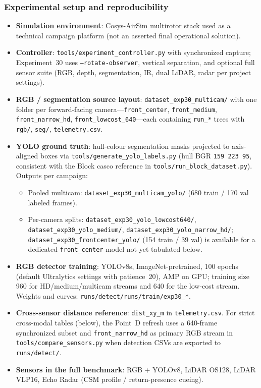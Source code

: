 \subsubsection{Experimental setup and reproducibility}
\begin{itemize}
  \item \textbf{Simulation environment}: Cosys-AirSim multirotor stack used as a technical campaign platform (not an asserted final operational solution).
  \item \textbf{Controller}: \texttt{tools/experiment\_controller.py} with synchronized capture; Experiment~30 uses \texttt{--rotate-observer}, vertical separation, and optional full sensor suite (RGB, depth, segmentation, IR, dual LiDAR, radar per project settings).
  \item \textbf{RGB / segmentation source layout}: \texttt{dataset\_exp30\_multicam/} with one folder per forward-facing camera---\texttt{front\_center}, \texttt{front\_medium}, \texttt{front\_narrow\_hd}, \texttt{front\_lowcost\_640}---each containing \texttt{run\_*} trees with \texttt{rgb/}, \texttt{seg/}, \texttt{telemetry.csv}.
  \item \textbf{YOLO ground truth}: hull-colour segmentation masks projected to axis-aligned boxes via \texttt{tools/generate\_yolo\_labels.py} (hull BGR \texttt{159\,223\,95}, consistent with the Block casco reference in \texttt{tools/run\_block\_dataset.py}). Outputs per campaign:
  \begin{itemize}
    \item Pooled multicam: \texttt{dataset\_exp30\_multicam\_yolo/} (680 train / 170 val labeled frames).
    \item Per-camera splits: \texttt{dataset\_exp30\_yolo\_lowcost640/}, \texttt{dataset\_exp30\_yolo\_medium/}, \texttt{dataset\_exp30\_yolo\_narrow\_hd/}; \texttt{dataset\_exp30\_frontcenter\_yolo/} (154 train / 39 val) is available for a dedicated \texttt{front\_center} model not yet tabulated below.
  \end{itemize}
  \item \textbf{RGB detector training}: YOLOv8s, ImageNet-pretrained, 100 epochs (default Ultralytics settings with patience~20), AMP on GPU; training size 960 for HD/medium/multicam streams and 640 for the low-cost stream. Weights and curves: \texttt{runs/detect/runs/train/exp30\_*}.
  \item \textbf{Cross-sensor distance reference}: \texttt{dist\_xy\_m} in \texttt{telemetry.csv}. For strict cross-modal tables (below), the Point~D refresh uses a 640-frame synchronized subset and \texttt{front\_narrow\_hd} as primary RGB stream in \texttt{tools/compare\_sensors.py} when detection CSVs are exported to \texttt{runs/detect/}.
  \item \textbf{Sensors in the full benchmark}: RGB + YOLOv8, LiDAR OS128, LiDAR VLP16, Echo Radar (CSM profile / return-presence cueing).
\end{itemize}

